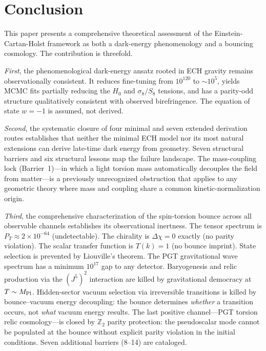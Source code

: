 \documentclass[aps,prd,twocolumn,superscriptaddress,showpacs,preprintnumbers,
  nofootinbib,longbibliography,floatfix]{revtex4-2}
\newcommand{\MPl}{M_{\rm Pl}}
\begin{document}
\section{Conclusion}\label{sec:conclusions}

This paper presents a comprehensive theoretical assessment of the
Einstein-Cartan-Holst framework as both a dark-energy phenomenology and a
bouncing cosmology. The contribution is threefold.

\textit{First}, the phenomenological dark-energy ansatz rooted in ECH
gravity remains observationally consistent. It reduces fine-tuning from
$10^{120}$ to $\sim\!10^5$, yields MCMC fits partially reducing the $H_0$
and $\sigma_8/S_8$ tensions, and has a parity-odd structure qualitatively
consistent with observed birefringence. The equation of state $w=-1$ is
assumed, not derived.

\textit{Second}, the systematic closure of four minimal and seven extended
derivation routes establishes that neither the minimal ECH model nor its
most natural extensions can derive late-time dark energy from geometry.
Seven structural barriers and six structural lessons map the failure
landscape. The mass-coupling lock (Barrier~1)---in which a light torsion
mass automatically decouples the field from matter---is a previously
unrecognized obstruction that applies to any geometric theory where mass
and coupling share a common kinetic-normalization origin.

\textit{Third}, the comprehensive characterization of the spin-torsion
bounce across all observable channels establishes its observational
inertness. The tensor spectrum is $P_T \approx 2\times 10^{-64}$
(undetectable). The chirality is $\Delta\chi = 0$ exactly (no parity
violation). The scalar transfer function is $T(k) = 1$ (no bounce
imprint). State selection is prevented by Liouville's theorem. The PGT
gravitational wave spectrum has a minimum $10^{17}$ gap to any detector.
Baryogenesis and relic production via the $(J^5)^2$ interaction are
killed by gravitational democracy at $T \sim \MPl$. Hidden-sector vacuum
selection via irreversible transitions is killed by bounce--vacuum energy
decoupling: the bounce determines \textit{whether} a transition occurs,
not \textit{what} vacuum energy results. The last positive channel---PGT
torsion relic cosmology---is closed by $\mathbb{Z}_2$ parity protection:
the pseudoscalar mode cannot be populated at the bounce without explicit
parity violation in the initial conditions. Seven additional barriers
(8--14) are cataloged.
\end{document}
